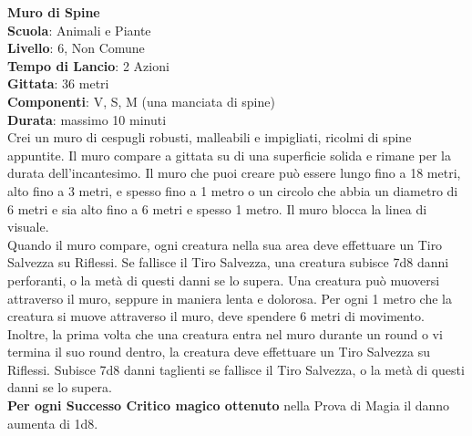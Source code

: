 \begin{multicols}{2}
\medskip\textbf{Muro di Spine}\\
\textbf{Scuola}: Animali e Piante\\
\textbf{Livello}: 6, Non Comune\\
\textbf{Tempo di Lancio}: 2 Azioni\\
\textbf{Gittata}: 36 metri\\
\textbf{Componenti}: V, S, M (una manciata di spine)\\
\textbf{Durata}: massimo 10 minuti\\
Crei un muro di cespugli robusti, malleabili e impigliati, ricolmi di spine appuntite. Il muro compare a gittata su di una superficie solida e rimane per la durata dell'incantesimo. Il muro che puoi creare può essere lungo fino a 18 metri, alto fino a 3 metri, e spesso fino a 1 metro o un circolo che abbia un diametro di 6 metri e sia alto fino a 6 metri e spesso 1 metro. Il muro blocca la linea di visuale.\\
Quando il muro compare, ogni creatura nella sua area deve effettuare un Tiro Salvezza su Riflessi. Se fallisce il Tiro Salvezza, una creatura subisce 7d8 danni perforanti, o la metà di questi danni se lo supera. Una creatura può muoversi attraverso il muro, seppure in maniera lenta e dolorosa. Per ogni 1 metro che la creatura si muove attraverso il muro, deve spendere 6 metri di movimento. Inoltre, la prima volta che una creatura entra nel muro durante un round o vi termina il suo round dentro, la creatura deve effettuare un Tiro Salvezza su Riflessi. Subisce 7d8 danni taglienti se fallisce il Tiro Salvezza, o la metà di questi danni se lo supera.\\
\textbf{Per ogni Successo Critico magico ottenuto} nella Prova di Magia il danno aumenta di 1d8.


\end{multicols}
